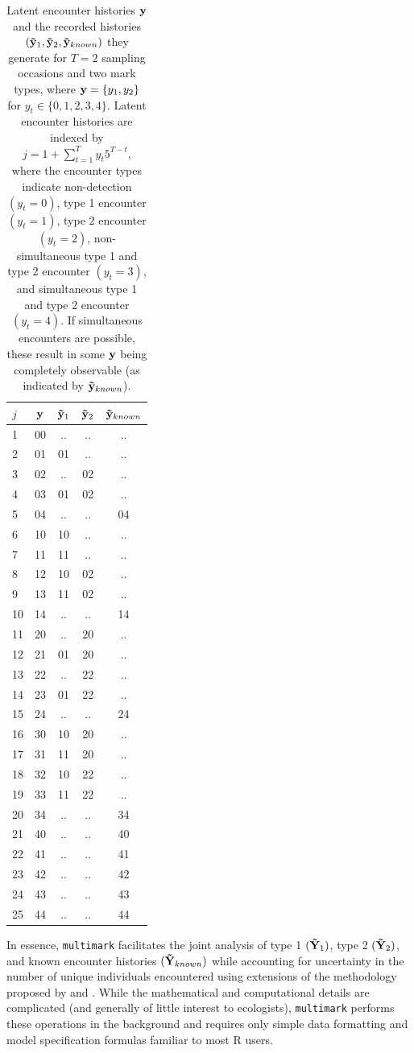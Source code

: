 \documentclass[12pt]{article}
\providecommand{\tabularnewline}{\\}
\begin{document}
\begin{table}
  \caption{\label{tab:hist} Latent encounter histories ${\bf y}$ and the recorded histories $({\bf {\tilde y}}_1, {\bf {\tilde y}}_2, {\bf {\tilde y}}_{known})$ they generate for $T=2$ sampling occasions and two mark types, where ${\bf y}=\{y_1,y_2\}$ for $y_t \in \{0,1,2,3,4\}$. Latent encounter histories are indexed by $j=1+\sum_{t=1}^T y_t 5^{T-t}$, where the encounter types indicate non-detection $(y_t=0)$, type 1 encounter $(y_t=1)$, type 2 encounter $(y_t=2)$, non-simultaneous type 1 and type 2 encounter $(y_t=3)$, and simultaneous type 1 and type 2 encounter $(y_t=4)$. If simultaneous encounters are possible, these result in some ${\bf y}$ being completely observable (as indicated by ${\bf {\tilde y}}_{known}$).}
  \begin{tabular}{lc|ccc}
  \hline 
  $j$ & ${\bf y}$ & ${\bf {\tilde y}}_1$ &  ${\bf {\tilde y}}_2$ & ${\bf {\tilde y}}_{known}$ \tabularnewline
  \hline 
  1 & 00 & .. & .. & .. \tabularnewline
  2 & 01 & 01 & .. & .. \tabularnewline
  3 & 02 & .. & 02 & .. \tabularnewline
  4 & 03 & 01 & 02 & .. \tabularnewline
  5 & 04 & .. & .. & 04 \tabularnewline
  6 & 10 & 10 & .. & .. \tabularnewline
  7 & 11 & 11 & .. & .. \tabularnewline
  8 & 12 & 10 & 02 & .. \tabularnewline
  9 & 13 & 11 & 02 & .. \tabularnewline
  10 & 14 & .. & .. & 14 \tabularnewline
  11 & 20 & .. & 20 & .. \tabularnewline
  12 & 21 & 01 & 20 & .. \tabularnewline
  13 & 22 & .. & 22 & .. \tabularnewline
  14 & 23 & 01 & 22 & .. \tabularnewline
  15 & 24 & .. & .. & 24 \tabularnewline
  16 & 30 & 10 & 20 & .. \tabularnewline
  17 & 31 & 11 & 20 & .. \tabularnewline
  18 & 32 & 10 & 22 & .. \tabularnewline
  19 & 33 & 11 & 22 & .. \tabularnewline
  20 & 34 & .. & .. & 34 \tabularnewline
  21 & 40 & .. & .. & 40 \tabularnewline
  22 & 41 & .. & .. & 41 \tabularnewline
  23 & 42 & .. & .. & 42 \tabularnewline
  24 & 43 & .. & .. & 43 \tabularnewline
  25 & 44 & .. & .. & 44 \tabularnewline
  \hline 
  \end{tabular}
\end{table}

In essence, \verb|multimark| facilitates the joint analysis of type 1 $({\bf {\tilde Y}}_1)$, type 2 $({\bf {\tilde Y}}_2)$, and known encounter histories $({\bf {\tilde Y}}_{known})$ while accounting for uncertainty in the number of unique individuals encountered using extensions of the methodology proposed by \cite{BonnerHolmberg2013} and \cite{McClintockEtAl2013a}. While the mathematical and computational details are complicated (and generally of little interest to ecologists), \verb|multimark| performs these operations in the background and requires only simple data formatting and model specification formulas familiar to most R users.
\end{document}

